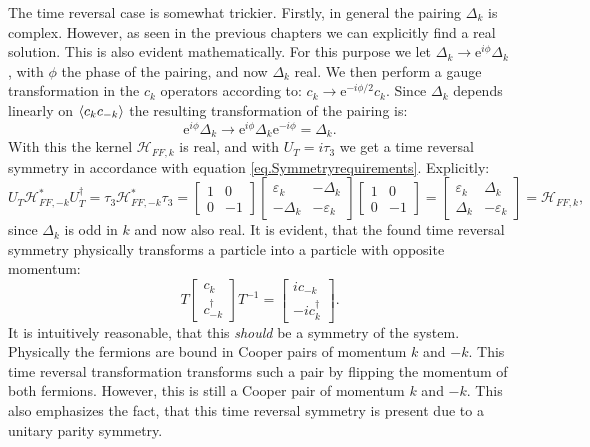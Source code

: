 The time reversal case is somewhat trickier. Firstly, in general the pairing $\Delta_k$ is complex. However, as seen in the previous chapters we can explicitly find a real solution. This is also evident mathematically. For this purpose we let $\Delta_k \to \text{e}^{i\phi}\Delta_k$, with $\phi$ the phase of the pairing, and now $\Delta_k$ real. We then perform a gauge transformation in the $c_k$ operators according to: $c_k \to \text{e}^{-i\phi/2} c_k$. Since $\Delta_k$ depends linearly on $\braket{c_kc_{-k}}$ the resulting transformation of the pairing is:
\begin{equation}
\text{e}^{i\phi}\Delta_k \to \text{e}^{i\phi}\Delta_k\text{e}^{-i\phi} = \Delta_k. \nonumber
\end{equation}
With this the kernel $\mathcal{H}_{FF,k}$ is real, and with $U_T = i\tau_3$ we get a time reversal symmetry in accordance with equation \ref{eq.Symmetryrequirements}. Explicitly:
\begin{equation}
U_T\mathcal{H}^*_{FF,-k}U^\dagger_T = \tau_3\mathcal{H}^*_{FF,-k}\tau_3 = \begin{bmatrix} 1 & 0 \\ 0 & -1 \end{bmatrix}\begin{bmatrix} \varepsilon_k & -\Delta_k \\ -\Delta_k & -\varepsilon_k \end{bmatrix} \begin{bmatrix} 1 & 0 \\ 0 & -1 \end{bmatrix} = \begin{bmatrix} \varepsilon_k & \Delta_k \\ \Delta_k & -\varepsilon_k \end{bmatrix} = \mathcal{H}_{FF,k}, \nonumber
\end{equation}
since $\Delta_k$ is odd in $k$ and now also real. It is evident, that the found time reversal symmetry physically transforms a particle into a particle with opposite momentum:
\begin{equation}
T \begin{bmatrix} c_k \\ c^\dagger_{-k} \end{bmatrix} T^{-1} = \begin{bmatrix} i c_{-k} \\ - i c^\dagger_{k} \end{bmatrix}. \nonumber
\end{equation}
It is intuitively reasonable, that this \textit{should} be a symmetry of the system. Physically the fermions are bound in Cooper pairs of momentum $k$ and $-k$. This time reversal transformation transforms such a pair by flipping the momentum of both fermions. However, this is still a Cooper pair of momentum $k$ and $-k$. This also emphasizes the fact, that this time reversal symmetry is present due to a unitary parity symmetry. 

